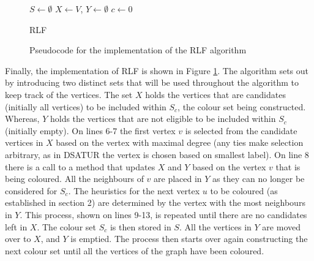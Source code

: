 \begin{figure}[H]
    \centering
        \begin{algorithm}[H]
        \DontPrintSemicolon
        
        \BlankLine

        $S \leftarrow \emptyset$ \;
        $X \leftarrow V$, $Y \leftarrow \emptyset$ \;
        $c \leftarrow 0$ \;
    
        \caption{RLF}
        \end{algorithm}
    \caption{Pseudocode for the implementation of the RLF algorithm}
    \label{fig:RLFImpPseudo}
\end{figure}

Finally, the implementation of RLF is shown in Figure \ref{fig:RLFImpPseudo}. The algorithm sets out by introducing two distinct sets that will be used throughout the algorithm to keep track of the vertices. The set $X$ holds the vertices that are candidates (initially all vertices) to be included within $S_{c}$, the colour set being constructed. Whereas, $Y$ holds the vertices that are not eligible to be included within $S_{c}$ (initially empty). On lines 6-7 the first vertex $v$ is selected from the candidate vertices in $X$ based on the vertex with maximal degree (any ties make selection arbitrary, as in DSATUR the vertex is chosen based on smallest label). On line 8 there is a call to a method that updates $X$ and $Y$ based on the vertex $v$ that is being coloured. All the neighbours of $v$ are placed in $Y$ as they can no longer be considered for $S_{c}$. The heuristics for the next vertex $u$ to be coloured (as established in section 2) are determined by the vertex with the most neighbours in $Y$. This process, shown on lines 9-13, is repeated until there are no candidates left in $X$. The colour set $S_{c}$ is then stored in $S$. All the vertices in $Y$ are moved over to $X$, and $Y$ is emptied. The process then starts over again constructing the next colour set until all the vertices of the graph have been coloured.  

